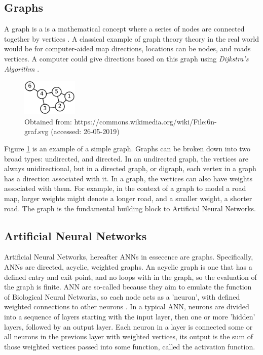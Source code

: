     \subsection{Graphs}
    A graph is a is a mathematical concept where a series of nodes are connected together by vertices \cite{chartrand2010graphs}. A classical example of graph theory theory in the real world would be for computer-aided map directions, locations can be nodes, and roads vertices. A computer could give directions based on this graph using {\slshape Dijkstra's Algorithm} \cite{dijkstra1959note}.

    \begin{figure}[h]
        \centering
        \includegraphics[width=100px]{../img/1000px-6n-graf.png}
        \caption{Obtained from: https://commons.wikimedia.org/wiki/File:6n-graf.svg (accessed: 26-05-2019)}
        \label{fig:simplegraph}
    \end{figure}

    Figure \ref{fig:simplegraph} is an example of a simple graph. Graphs can be broken down into two broad types: undirected, and directed. In an undirected graph, the vertices are always unidirectional, but in a directed graph, or digraph, each vertex in a graph has a direction associated with it. In a graph, the vertices can also have weights associated with them. For example, in the context of a graph to model a road map, larger weights might denote a longer road, and a smaller weight, a shorter road. The graph is the fundamental building block to Artificial Neural Networks.

    \subsection{Artificial Neural Networks}
    Artificial Neural Networks, hereafter ANNs in essecence are graphs. Specifically, ANNs are directed, acyclic, weighted graphs. An acyclic graph is one that has a defined entry and exit point, and no loops with in the graph, so the evaluation of the graph is finite. ANN are so-called because they aim to emulate the function of Biological Neural Networks, so each node acts as a 'neuron', with defined weighted connections to other neurons \cite{hopfield1982neural}. In a typical ANN, neurons are divided into a sequence of layers starting with the input layer, then one or more 'hidden' layers, followed by an output layer. Each neuron in a layer is connected some or all neurons in the previous layer with weighted vertices, its output is the sum of those weighted vertices passed into some function, called the activation function. 

